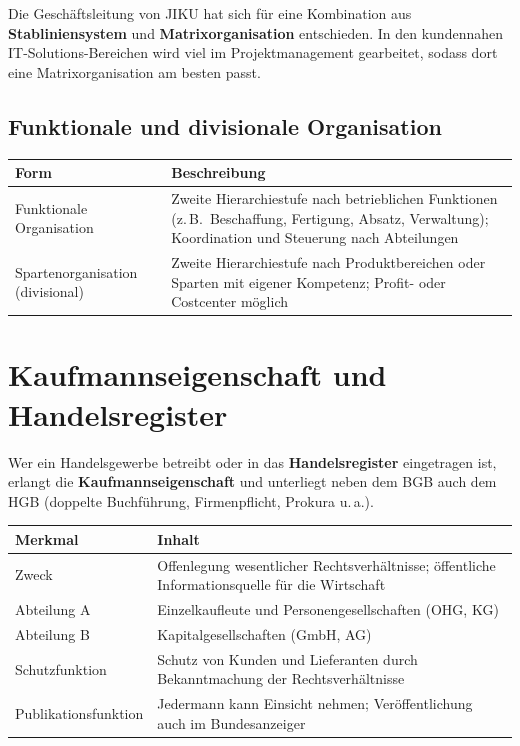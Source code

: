\documentclass[11pt, a4paper]{article}
\begin{document}
\begin{merksatz}[title={\bfseries JIKU IT-Solutions: Kombination aus Stablinien- und Matrixorganisation}]
Die Geschäftsleitung von JIKU hat sich für eine Kombination aus \textbf{Stabliniensystem}
und \textbf{Matrixorganisation} entschieden. In den kundennahen IT-Solutions-Bereichen wird
viel im Projektmanagement gearbeitet, sodass dort eine Matrixorganisation am besten passt.
\end{merksatz}

\subsection{Funktionale und divisionale Organisation}

\begin{center}
\begin{tabular}{p{3.5cm} p{9.5cm}}
\toprule
\textbf{Form} & \textbf{Beschreibung}\\
\midrule
Funktionale Organisation & Zweite Hierarchiestufe nach betrieblichen Funktionen (z.\,B.\ Beschaffung,
Fertigung, Absatz, Verwaltung); Koordination und Steuerung nach Abteilungen\\
\addlinespace
Spartenorganisation (divisional) & Zweite Hierarchiestufe nach Produktbereichen oder Sparten mit
eigener Kompetenz; Profit- oder Costcenter möglich\\
\bottomrule
\end{tabular}
\end{center}

\section{Kaufmannseigenschaft und Handelsregister}

Wer ein Handelsgewerbe betreibt oder in das \textbf{Handelsregister} eingetragen ist, erlangt
die \textbf{Kaufmannseigenschaft} und unterliegt neben dem BGB auch dem HGB (doppelte Buchführung,
Firmenpflicht, Prokura u.\,a.).

\begin{center}
\begin{tabular}{p{3cm} p{10cm}}
\toprule
\textbf{Merkmal} & \textbf{Inhalt}\\
\midrule
Zweck & Offenlegung wesentlicher Rechtsverhältnisse; öffentliche Informationsquelle für die Wirtschaft\\
Abteilung A & Einzelkaufleute und Personengesellschaften (OHG, KG)\\
Abteilung B & Kapitalgesellschaften (GmbH, AG)\\
Schutzfunktion & Schutz von Kunden und Lieferanten durch Bekanntmachung der Rechtsverhältnisse\\
Publikationsfunktion & Jedermann kann Einsicht nehmen; Veröffentlichung auch im Bundesanzeiger\\
\bottomrule
\end{tabular}
\end{center}
\end{document}

